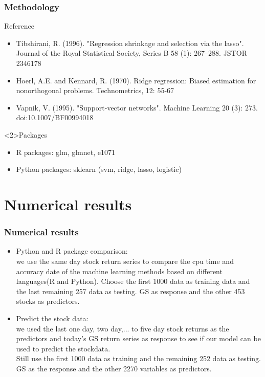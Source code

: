 \documentclass{beamer}
\begin{document}
\begin{frame}
\frametitle{Methodology }
  \begin{block}{Reference}
   \begin{itemize}
        \item  Tibshirani, R. (1996). "Regression shrinkage and selection via the lasso". Journal of the Royal Statistical Society, Series B 58 (1): 267–288. JSTOR 2346178
        \item Hoerl, A.E. and Kennard, R. (1970). Ridge regression: Biased
estimation for nonorthogonal problems. Technometrics, 12:
55-67
        \item Vapnik, V. (1995). "Support-vector networks". Machine Learning 20 (3): 273. doi:10.1007/BF00994018
    \end{itemize}
  \end{block}

  \begin{block}<2>{Packages}
    \begin{itemize}
        \item  R packages: glm, glmnet, e1071
        \item  Python packages: sklearn (svm, ridge, lasso, logistic)
    \end{itemize}
  \end{block}

\end{frame}


\section{Numerical results}

\begin{frame}
\frametitle{Numerical results}
\begin{itemize}
        \item  Python and R package comparison:\\
        we use the same day stock return series to compare the cpu time and accuracy date of the machine learning methods based on different languages(R and Python). Choose the first 1000 data as training data and the last remaining 257 data as testing. GS as response and the other 453 stocks as predictors.\\
        \item  Predict the stock data:\\
        we used the last one day, two day,... to five day stock returns as the predictors and today's
        GS return series as response to see if our model can be used to predict the stockdata.\\
        Still use the first 1000 data as training and the remaining 252 data as testing. GS as the response and the other 2270 variables as predictors.\\
    \end{itemize}

\end{frame}
\end{document}
